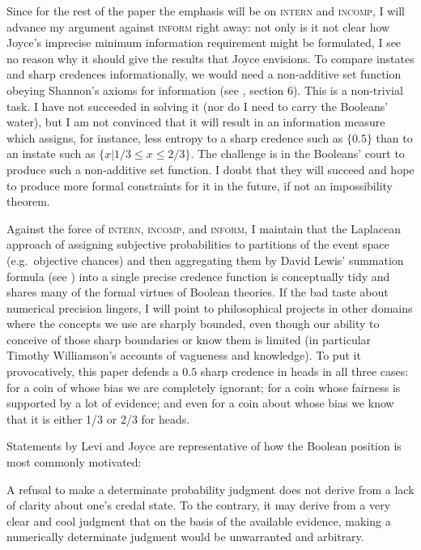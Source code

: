 \documentclass[11pt]{article}
\begin{document}
Since for the rest of the paper the emphasis will be on
\textsc{intern} and \textsc{incomp}, I will advance my argument
against \textsc{inform} right away: not only is it not clear how
Joyce's imprecise minimum information requirement might be formulated,
I see no reason why it should give the results that Joyce envisions.
To compare instates and sharp credences informationally, we would need
a non-additive set function obeying Shannon's axioms for information
(see , section 6). This is a non-trivial task. I
have not succeeded in solving it (nor do I need to carry the Booleans'
water), but I am not convinced that it will result in an information
measure which assigns, for instance, less entropy to a sharp credence
such as $\{0.5\}$ than to an instate such as
$\{x|1/3\leq{}x\leq{}2/3\}$. The challenge is in the Booleans' court
to produce such a non-additive set function. I doubt that they will
succeed and hope to produce more formal constraints for it in the
future, if not an impossibility theorem.

Against the force of \textsc{intern}, \textsc{incomp}, and
\textsc{inform}, I maintain that the Laplacean approach of assigning
subjective probabilities to partitions of the event space (e.g.\
objective chances) and then aggregating them by David Lewis' summation
formula (see \scite{8}{lewis81}{266f}) into a single precise credence
function is conceptually tidy and shares many of the formal virtues of
Boolean theories. If the bad taste about numerical precision lingers,
I will point to philosophical projects in other domains where the
concepts we use are sharply bounded, even though our ability to
conceive of those sharp boundaries or know them is limited (in
particular Timothy Williamson's accounts of vagueness and knowledge).
To put it provocatively, this paper defends a $0.5$ sharp credence in
heads in all three cases: for a coin of whose bias we are completely
ignorant; for a coin whose fairness is supported by a lot of evidence;
and even for a coin about whose bias we know that it is either 1/3 or
2/3 for heads.

Statements by Levi and Joyce are representative of how the Boolean
position is most commonly motivated:

\begin{quotex}
  A refusal to make a determinate probability judgment does not derive
  from a lack of clarity about one's credal state. To the contrary, it
  may derive from a very clear and cool judgment that on the basis of
  the available evidence, making a numerically determinate judgment
  would be unwarranted and arbitrary. \scite{3}{levi85}{395}
\end{quotex}
\end{document}

